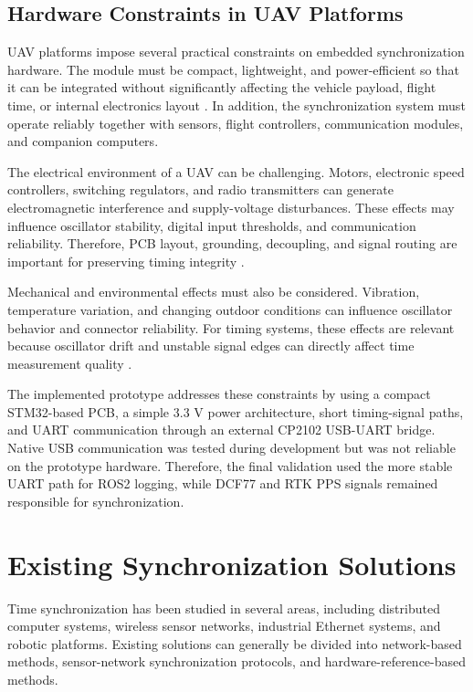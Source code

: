 \subsection{Hardware Constraints in UAV Platforms}

UAV platforms impose several practical constraints on embedded synchronization hardware. The module must be compact, lightweight, and power-efficient so that it can be integrated without significantly affecting the vehicle payload, flight time, or internal electronics layout \cite{r2,r7}. In addition, the synchronization system must operate reliably together with sensors, flight controllers, communication modules, and companion computers.

The electrical environment of a UAV can be challenging. Motors, electronic speed controllers, switching regulators, and radio transmitters can generate electromagnetic interference and supply-voltage disturbances. These effects may influence oscillator stability, digital input thresholds, and communication reliability. Therefore, PCB layout, grounding, decoupling, and signal routing are important for preserving timing integrity \cite{kopetz2011realtime}.

Mechanical and environmental effects must also be considered. Vibration, temperature variation, and changing outdoor conditions can influence oscillator behavior and connector reliability. For timing systems, these effects are relevant because oscillator drift and unstable signal edges can directly affect time measurement quality \cite{allan1966statistics,levine2012atomic}.

The implemented prototype addresses these constraints by using a compact STM32-based PCB, a simple 3.3 V power architecture, short timing-signal paths, and UART communication through an external CP2102 USB-UART bridge. Native USB communication was tested during development but was not reliable on the prototype hardware. Therefore, the final validation used the more stable UART path for ROS2 logging, while DCF77 and RTK PPS signals remained responsible for synchronization.

\section{Existing Synchronization Solutions}

Time synchronization has been studied in several areas, including distributed computer systems, wireless sensor networks, industrial Ethernet systems, and robotic platforms. Existing solutions can generally be divided into network-based methods, sensor-network synchronization protocols, and hardware-reference-based methods.


